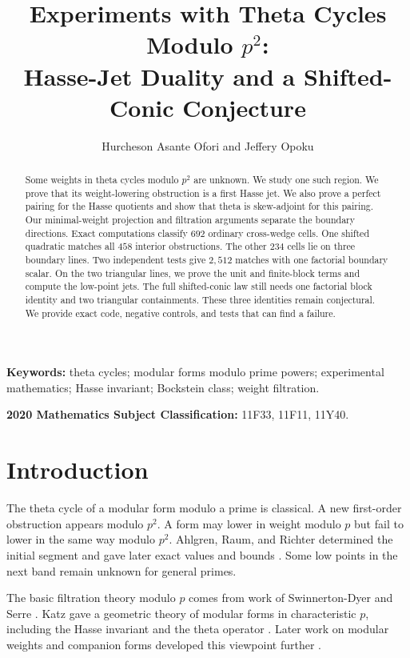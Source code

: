 \documentclass[11pt]{article}
\title{Experiments with Theta Cycles Modulo $p^2$:\\
Hasse-Jet Duality and a Shifted-Conic Conjecture}
\author{Hurcheson Asante Ofori and Jeffery Opoku}
\date{}
\theoremstyle{remark}
\begin{document}
\maketitle

\begin{abstract}
Some weights in theta cycles modulo $p^2$ are unknown.  We study one such
region.  We prove that its weight-lowering obstruction is a first Hasse jet.
We also prove a perfect pairing for the Hasse quotients and show that theta is
skew-adjoint for this pairing.  Our minimal-weight projection and filtration
arguments separate the boundary directions.  Exact computations classify
$692$ ordinary cross-wedge cells.  One shifted quadratic matches all $458$
interior obstructions.  The other $234$ cells lie on three boundary lines.
Two independent tests give $2{,}512$ matches with one factorial boundary
scalar.  On the two triangular lines, we prove the unit and finite-block
terms and compute the low-point jets.  The full shifted-conic law still needs
one factorial block identity and two triangular containments.  These three
identities remain conjectural.  We provide exact code, negative controls, and
tests that can find a failure.
\end{abstract}

\noindent\textbf{Keywords:} theta cycles; modular forms modulo prime powers;
experimental mathematics; Hasse invariant; Bockstein class; weight
filtration.

\noindent\textbf{2020 Mathematics Subject Classification:}
11F33, 11F11, 11Y40.

\section{Introduction}

The theta cycle of a modular form modulo a prime is classical.  A new
first-order obstruction appears modulo $p^2$.  A form may lower in weight
modulo $p$ but fail to lower in the same way modulo $p^2$.
Ahlgren, Raum, and Richter determined the initial segment and gave later
exact values and bounds \cite{ARR2026}.  Some low points in the next band
remain unknown for general primes.

The basic filtration theory modulo $p$ comes from work of
Swinnerton-Dyer and Serre \cite{SwDyer1973,Serre1973}.  Katz gave a
geometric theory of modular forms in characteristic $p$, including the
Hasse invariant and the theta operator \cite{Katz1973}.  Later work on
modular weights and companion forms developed this viewpoint further
\cite{Edixhoven1992,ColemanVoloch1992}.
\end{document}
